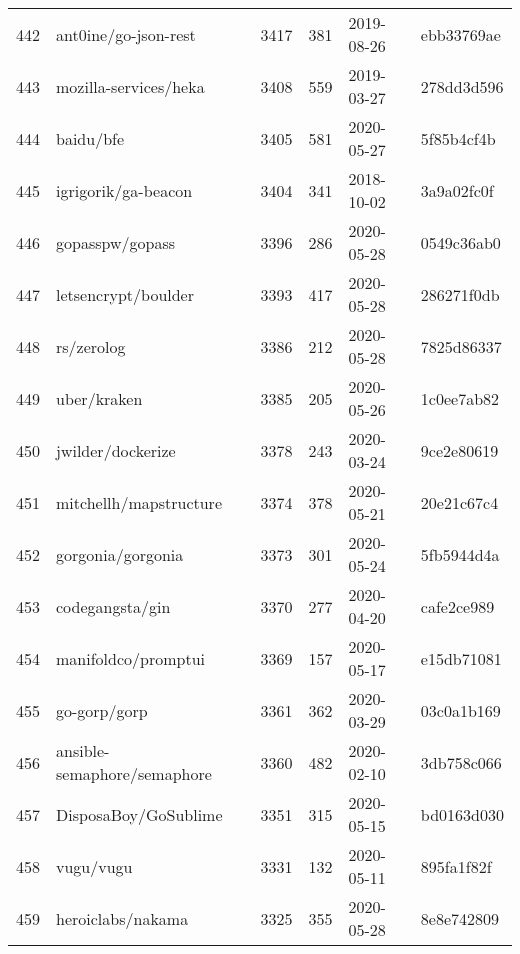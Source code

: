 \begin{longtable}{llrrll}
    442 &                               ant0ine/go-json-rest &   3417 &    381 & 2019-08-26 &  ebb33769ae \\
    443 &                              mozilla-services/heka &   3408 &    559 & 2019-03-27 &  278dd3d596 \\
    444 &                                          baidu/bfe &   3405 &    581 & 2020-05-27 &  5f85b4cf4b \\
    445 &                                igrigorik/ga-beacon &   3404 &    341 & 2018-10-02 &  3a9a02fc0f \\
    446 &                                    gopasspw/gopass &   3396 &    286 & 2020-05-28 &  0549c36ab0 \\
    447 &                                letsencrypt/boulder &   3393 &    417 & 2020-05-28 &  286271f0db \\
    448 &                                         rs/zerolog &   3386 &    212 & 2020-05-28 &  7825d86337 \\
    449 &                                        uber/kraken &   3385 &    205 & 2020-05-26 &  1c0ee7ab82 \\
    450 &                                  jwilder/dockerize &   3378 &    243 & 2020-03-24 &  9ce2e80619 \\
    451 &                             mitchellh/mapstructure &   3374 &    378 & 2020-05-21 &  20e21c67c4 \\
    452 &                                  gorgonia/gorgonia &   3373 &    301 & 2020-05-24 &  5fb5944d4a \\
    453 &                                    codegangsta/gin &   3370 &    277 & 2020-04-20 &  cafe2ce989 \\
    454 &                                manifoldco/promptui &   3369 &    157 & 2020-05-17 &  e15db71081 \\
    455 &                                       go-gorp/gorp &   3361 &    362 & 2020-03-29 &  03c0a1b169 \\
    456 &                        ansible-semaphore/semaphore &   3360 &    482 & 2020-02-10 &  3db758c066 \\
    457 &                               DisposaBoy/GoSublime &   3351 &    315 & 2020-05-15 &  bd0163d030 \\
    458 &                                          vugu/vugu &   3331 &    132 & 2020-05-11 &  895fa1f82f \\
    459 &                                  heroiclabs/nakama &   3325 &    355 & 2020-05-28 &  8e8e742809 \\

\end{longtable}
